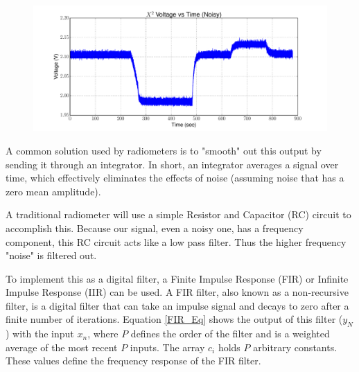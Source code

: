 {\begin{figure}[h!tb] 
\centering
\includegraphics[width=17cm]{Experiments/Exp1/noisy_voltage.pdf}
\label{square_raw}
\end{figure}
}

A common solution used by radiometers is to "smooth" out this output by sending it through an integrator.  In short, an integrator averages a signal over time, which effectively eliminates the effects of noise (assuming noise that has a zero mean amplitude).  

A traditional radiometer will use a simple Resistor and Capacitor (RC) circuit to accomplish this.  Because our signal, even a noisy one, has a frequency component, this RC circuit acts like a low pass filter.  Thus the higher frequency "noise" is filtered out.


To implement this as a digital filter, a Finite Impulse Response (FIR) or Infinite Impulse Response (IIR) can be used.  A FIR filter, also known as a non-recursive filter, is a digital filter that can take an impulse signal and decays to zero after a finite number of iterations.  Equation \ref{FIR_Eq} shows the output of this filter ($y_N$) with the input $x_n$, where $P$ defines the order of the filter and is a weighted average of the most recent $P$ inputs.  The array $c_i$ holds $P$ arbitrary constants.  These values define the frequency response of the FIR filter.  

